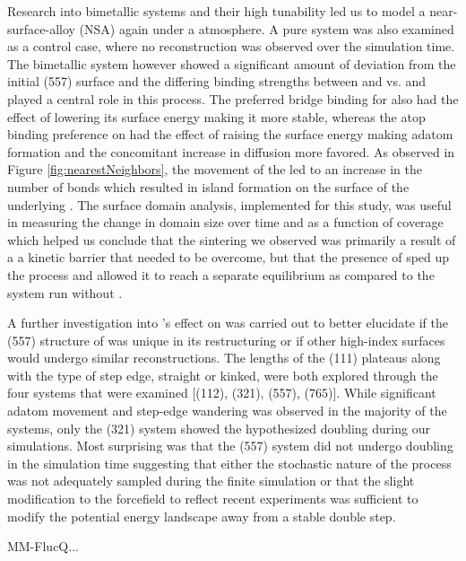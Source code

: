 Research into bimetallic systems and their high tunability led us to model a
 near-surface-alloy (NSA) again under a  atmosphere. A
pure  system was also examined as a control case, where no
reconstruction was observed over the simulation time. The bimetallic system
however showed a significant amount of deviation from the initial (557) surface
and the differing binding strengths between  and  vs.  and
 played a central role in this process. The preferred bridge binding for
 also had the effect of lowering its surface energy making it
more stable, whereas the atop binding preference on  had the effect of
raising the surface energy making adatom formation and the concomitant increase
in diffusion more favored. As observed in Figure \ref{fig:nearestNeighbors},
the movement of the  led to an increase in the number of
 bonds which resulted in island formation on the surface of
the underlying . The surface domain analysis, implemented for this
study, was useful in measuring the change in domain size over time and as a
function of  coverage which helped us conclude that the sintering we
observed was primarily a result of a a kinetic barrier that needed to be
overcome, but that the presence of  sped up the process and allowed it
to reach a separate equilibrium as compared to the system run without .

A further investigation into 's effect on  was carried out to
better elucidate if the (557) structure of  was unique in its
restructuring or if other high-index surfaces would undergo similar
reconstructions. The lengths of the (111) plateaus along with the type of step
edge, straight or kinked, were both explored through the four systems that were
examined [(112), (321), (557), (765)]. While significant adatom movement and
step-edge wandering was observed in the majority of the systems, only the (321)
system showed the hypothesized doubling during our simulations. Most surprising
was that the (557) system did not undergo doubling in the simulation time
suggesting that either the stochastic nature of the process was not adequately
sampled during the finite simulation or that the slight modification to the
 forcefield to reflect recent
experiments\citep{Deshlahra:2012aa} was sufficient to modify the potential
energy landscape away from a stable double step.

%
MM-FlucQ...


